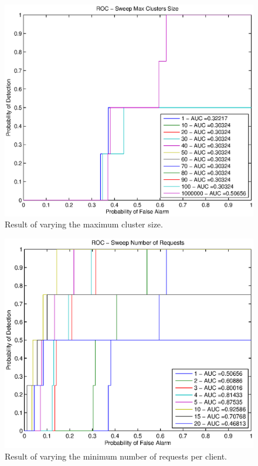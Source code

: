 \documentclass[conference]{IEEEtran}
\begin{document}
\begin{figure}
  \centering
  \includegraphics[width=0.9\linewidth]{clusters_sweep.eps}
  \caption{Result of varying the maximum cluster size.}
  \label{fig:test:cluster}
\end{figure}

\begin{figure}
  \centering
  \includegraphics[width=0.9\linewidth]{requests_sweep.eps}
  \caption{Result of varying the minimum number of requests per client.}
  \label{fig:test:requests}
\end{figure}
\end{document}
